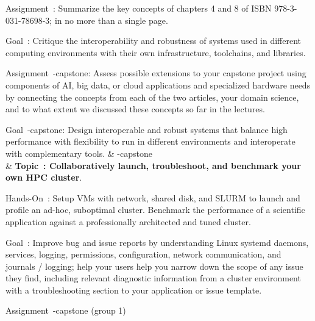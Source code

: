 \documentclass[12pt]{article}
\newcounter{cls}
\newcommand{\labelcls}[1]{\refstepcounter{cls}\thecls\label{#1}}
\begin{document}
\begin{mpxtabular}
    \vspace{.5\baselineskip}
    Assignment~:
    Summarize the key concepts of chapters 4 and 8 of ISBN 978-3-031-78698-3; %
    in no more than a single page.

    \vspace{.5\baselineskip}
    Goal~: Critique %
    the interoperability and robustness of systems %
    used in different computing environments %
    with their own infrastructure, toolchains, and libraries.

    \vspace{.5\baselineskip}
    Assignment~-capstone: %
    Assess possible extensions to your capstone project %
    using components of AI, big data, or cloud applications %
    and specialized hardware needs %
    by connecting the concepts from each of the two articles, %
    your domain science, and %
    to what extent we discussed these concepts so far in the lectures.

    \vspace{.5\baselineskip}
    Goal~-capstone: Design interoperable and robust %
    systems that balance high performance with flexibility %
    to run in different environments %
    and interoperate with complementary tools.
  & -capstone\\
  & \textbf{Topic~\labelcls{a-self-host}: Collaboratively launch, %
    troubleshoot, and benchmark your own HPC cluster}.

    \vspace{.5\baselineskip}
    Hands-On~: Setup VMs with %
    network, shared disk, and SLURM %
    to launch and profile an ad-hoc, suboptimal cluster.
    Benchmark the performance of a scientific application against %
    a professionally architected and tuned cluster.

    \vspace{.5\baselineskip}
    Goal~: Improve bug and issue reports by %
    understanding Linux systemd daemons, %
    services, logging, permissions, configuration, network communication, and %
    journals / logging; %
    help your users help you narrow down the scope of any issue they find, %
    including relevant diagnostic information from a cluster environment %
    with a troubleshooting section to your application or issue template.

    \vspace{.5\baselineskip}
    Assignment~-capstone (group 1) %


\end{mpxtabular}
\end{document}
